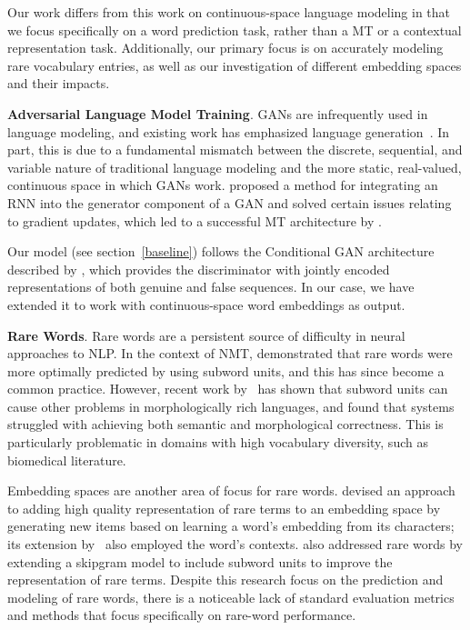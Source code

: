 \documentclass[11pt,a4paper]{article}
\begin{document}
Our work differs from this work on continuous-space language modeling in that we focus specifically on a word prediction task, rather than a MT or a contextual representation task.
Additionally, our primary focus is on accurately modeling rare vocabulary entries, as well as our investigation of different embedding spaces and their impacts.

\noindent
\textbf{Adversarial Language Model Training}. 
GANs are infrequently used in language modeling, and existing work has emphasized language generation~\citep{subramanian,press2017language}.
In part, this is due to a fundamental mismatch between the discrete, sequential, and variable nature of traditional language modeling and the more static, real-valued, continuous space in which GANs work. 
\citet{yu2017seqgan} proposed a method for integrating an RNN into the generator component of a GAN and solved certain issues relating to gradient updates, which led to a successful MT architecture by \citep{yang2017improving}.

Our model (see section~\ref{baseline}) follows the Conditional GAN architecture described by \citet{mirza2014conditional}, which provides the discriminator with jointly encoded representations of both genuine and false sequences. In our case, we have extended it to work with continuous-space word embeddings as output.

\noindent
\textbf{Rare Words}. Rare words are a persistent source of difficulty in neural approaches to NLP. 
In the context of NMT, \citet{sennrich2016neural} demonstrated that rare words were more optimally predicted by using subword units, and this has since become a common practice. 
However, recent work by~\citet{czarnowska2019don} has shown that subword units can cause other problems in morphologically rich languages, and found that systems struggled with achieving both semantic and morphological correctness.
This is particularly problematic in domains with high vocabulary diversity, such as biomedical literature.

Embedding spaces are another area of focus for rare words. \citet{pinter2017mimicking} devised an approach to adding high quality representation of rare terms to an embedding space by generating new items based on learning a word's embedding from its characters; its extension by~\citet{schick2019attentive} also employed the word's contexts. 
\citet{bojanowski2017enriching} also addressed rare words by extending a skipgram model to include subword units to improve the representation of rare terms.
Despite this research focus on the prediction and modeling of rare words, there is a noticeable lack of standard evaluation metrics and methods that focus specifically on rare-word performance.
\end{document}
